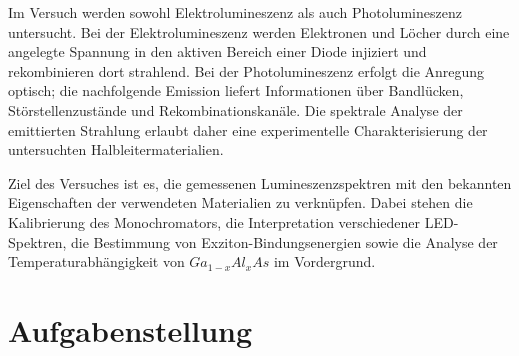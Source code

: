 \documentclass{article}
\begin{document}
Im Versuch werden sowohl Elektrolumineszenz als auch Photolumineszenz untersucht. Bei der Elektrolumineszenz werden Elektronen und Löcher durch eine angelegte Spannung in den aktiven Bereich einer Diode injiziert und rekombinieren dort strahlend. Bei der Photolumineszenz erfolgt die Anregung optisch; die nachfolgende Emission liefert Informationen über Bandlücken, Störstellenzustände und Rekombinationskanäle. Die spektrale Analyse der emittierten Strahlung erlaubt daher eine experimentelle Charakterisierung der untersuchten Halbleitermaterialien.

Ziel des Versuches ist es, die gemessenen Lumineszenzspektren mit den bekannten Eigenschaften der verwendeten Materialien zu verknüpfen. Dabei stehen die Kalibrierung des Monochromators, die Interpretation verschiedener LED-Spektren, die Bestimmung von Exziton-Bindungsenergien sowie die Analyse der Temperaturabhängigkeit von $Ga_{1-x}Al_xAs$ im Vordergrund.

\section{Aufgabenstellung}
\end{document}
